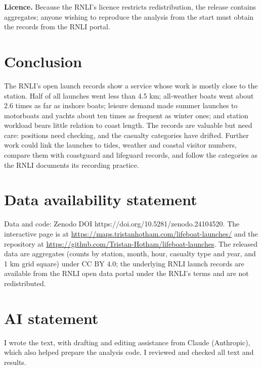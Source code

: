 \documentclass[11pt,a4paper]{article}
\begin{document}
\textbf{Licence.} Because the RNLI's licence restricts redistribution, the release contains aggregates; anyone wishing to reproduce the analysis from the start must obtain the records from the RNLI portal.

\section{Conclusion}\label{sec:conc}
The RNLI's open launch records show a service whose work is mostly close to the station. Half of all launches went less than 4.5 km; all-weather boats went about 2.6 times as far as inshore boats; leisure demand made summer launches to motorboats and yachts about ten times as frequent as winter ones; and station workload bears little relation to coast length. The records are valuable but need care: positions need checking, and the casualty categories have drifted. Further work could link the launches to tides, weather and coastal visitor numbers, compare them with coastguard and lifeguard records, and follow the categories as the RNLI documents its recording practice.

\section*{Data availability statement}
Data and code: Zenodo DOI https://doi.org/10.5281/zenodo.24104520. The interactive page is at \url{https://maps.tristanhotham.com/lifeboat-launches/} and the repository at \url{https://github.com/Tristan-Hotham/lifeboat-launches}. The released data are aggregates (counts by station, month, hour, casualty type and year, and 1 km grid square) under CC BY 4.0; the underlying RNLI launch records are available from the RNLI open data portal under the RNLI's terms and are not redistributed.

\section*{AI statement}
I wrote the text, with drafting and editing assistance from Claude (Anthropic), which also helped prepare the analysis code. I reviewed and checked all text and results.
\end{document}
